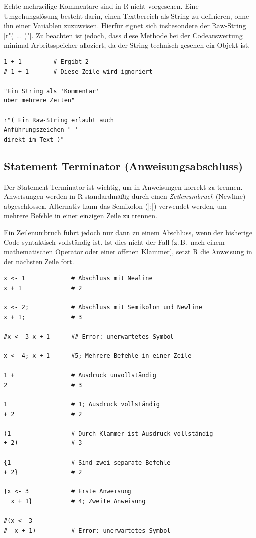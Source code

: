 \documentclass[10pt,twocolumn]{scrartcl}
\renewcommand{\lstinline}{\mycoloredinline}
\begin{document}
Echte mehrzeilige Kommentare sind in R nicht vorgesehen. Eine Umgehungslösung besteht darin, einen Textbereich als String zu definieren, ohne ihn einer Variablen zuzuweisen. Hierfür eignet sich insbesondere der Raw-String \lstinline|r"( ... )"|. Zu beachten ist jedoch, dass diese Methode bei der Codeauswertung minimal Arbeitsspeicher alloziert, da der String technisch gesehen ein Objekt ist.

\begin{lstlisting}
1 + 1         # Ergibt 2
# 1 + 1       # Diese Zeile wird ignoriert

"Ein String als 'Kommentar'
über mehrere Zeilen"

r"( Ein Raw-String erlaubt auch
Anführungszeichen " '
direkt im Text )"
\end{lstlisting}


\subsection{Statement Terminator (Anweisungsabschluss)}

Der Statement Terminator ist wichtig, um in Anweisungen korrekt zu trennen.
Anweisungen werden in R standardmäßig durch einen \emph{Zeilenumbruch} (Newline) abgeschlossen. Alternativ kann das Semikolon (\lstinline|;|) verwendet werden, um mehrere Befehle in einer einzigen Zeile zu trennen.

Ein Zeilenumbruch führt jedoch nur dann zu einem Abschluss, wenn der bisherige Code syntaktisch vollständig ist. Ist dies nicht der Fall (z.\,B.\ nach einem mathematischen Operator oder einer offenen Klammer), setzt R die Anweisung in der nächsten Zeile fort.

\begin{lstlisting}
x <- 1             # Abschluss mit Newline
x + 1              # 2

x <- 2;            # Abschluss mit Semikolon und Newline
x + 1;             # 3

#x <- 3 x + 1      ## Error: unerwartetes Symbol

x <- 4; x + 1      #5; Mehrere Befehle in einer Zeile

1 +                # Ausdruck unvollständig
2                  # 3

1                  # 1; Ausdruck vollständig
+ 2                # 2

(1                 # Durch Klammer ist Ausdruck vollständig
+ 2)               # 3

{1                 # Sind zwei separate Befehle
+ 2}               # 2

{x <- 3            # Erste Anweisung
  x + 1}           # 4; Zweite Anweisung

#(x <- 3
#  x + 1)          # Error: unerwartetes Symbol
\end{lstlisting}
\end{document}
